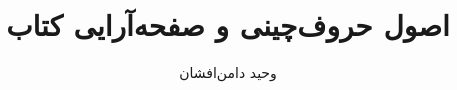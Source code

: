 \usepackage{makeidx}
\makeindex
\usepackage{xepersian}
\author{وحید دامن‌افشان}
\title{اصول حروف‌چینی و صفحه‌آرایی کتاب}
\date{}